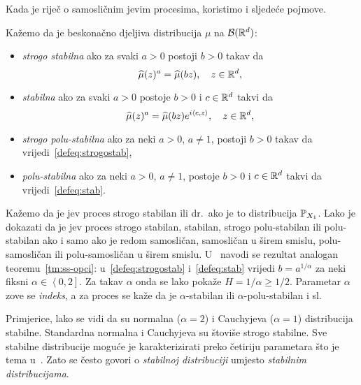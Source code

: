 \documentclass[main.tex]{subfiles}
\begin{document}
Kada je riječ o samosličnim \levy jevim procesima, koristimo i sljedeće pojmove.

\begin{definicija}\label{def:stab}
	Kažemo da je beskonačno djeljiva distribucija \( \mu \) na \( \mathcal B(\R^d) \):
	\begin{itemize}
		\item \emph{strogo stabilna} ako za svaki \( a > 0 \) postoji \( b > 0 \)
		      takav da \begin{equation}\label{defeq:strogostab}
			      \wh \mu(z)^a = \wh \mu(bz), \quad z \in \R^d,
		      \end{equation}
		\item \emph{stabilna} ako za svaki \( a > 0 \) postoje \( b > 0 \) i \( c \in \R^d \) takvi
		      da
		      \begin{equation}\label{defeq:stab}
			      \wh \mu(z)^a = \wh \mu(bz)e^{i \skp cz}, \quad z \in \R^d,
		      \end{equation}
		\item \emph{strogo polu-stabilna} ako za neki \( a > 0 \), \( a \neq 1 \), postoji \( b > 0 \) takav
		      da vrijedi~\eqref{defeq:strogostab},
		\item \emph{polu-stabilna} ako za neki \( a > 0 \), \( a \neq 1 \), postoje \( b > 0 \) i \( c \in \R^d \)
		      takvi da vrijedi~\eqref{defeq:stab}.
	\end{itemize}
\end{definicija}

Kažemo da je \levy jev proces strogo stabilan ili dr.\ ako je to distribucija
\( \P_{X_1} \). Lako je dokazati da je \levy jev proces strogo stabilan, stabilan, strogo polu-stabilan
ili polu-stabilan ako i samo ako je redom samosličan, samosličan u širem smislu,
polu-samosličan ili polu-samosličan u širem smislu. U~\cite[]{em} navodi se
rezultat analogan teoremu~\ref{tm:ss-opci}: u~\eqref{defeq:strogostab} i~\eqref{defeq:stab}
vrijedi \( b=a^{1/\alpha} \) za neki fiksni \( \alpha \in \left\langle 0, 2 \right] \). Za takav
\( \alpha \) onda se lako pokaže \( H = 1/\alpha \ge 1/2 \). Parametar \( \alpha \)
zove se \emph{indeks}, a za proces se kaže da je \( \alpha \)-stabilan ili \( \alpha \)-polu-stabilan i sl.

Primjerice, lako se vidi da su normalna (\( \alpha=2 \)) i Cauchyjeva (\( \alpha=1 \)) distribucija stabilne. Standardna normalna i Cauchyjeva
su štoviše strogo stabilne. Sve stabilne distribucije moguće je karakterizirati preko četiriju
parametara što je tema u~\cite[]{sato}. Zato se često
govori o \emph{stabilnoj distribuciji} umjesto \emph{stabilnim distribucijama}.
\end{document}
